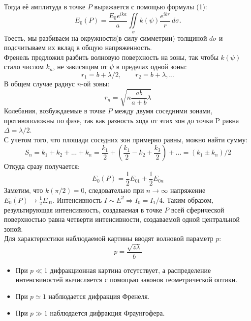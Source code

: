 \documentclass[12pt]{article}
\begin{document}
	  Тогда её амплитуда в точке $P$ выражается с помощью формулы (1):
	 \begin{equation}
	 E_0(P) = \frac{E_0 e^{ika}}{a} \iint\limits_\sigma k(\psi) \frac{e^{ikr}}{r}\,d\sigma.
	 \end{equation} 
	 Тоесть, мы разбиваем на окружности(в силу симметрии) толщиной $d\sigma$ и подсчитываем их вклад в общую напряженность.\\
	 Френель предложил разбить волновую поверхность на зоны, так чтобы $k(\psi)$ стало числом $k_n$, не зависящим от $\psi$ в пределах одной зоны: \begin{equation}
	 r_1 = b + \lambda/2, \mbox{ }\mbox{ }\mbox{ } r_2 = b + \lambda,...
	 \end{equation}
	 В общем случае радиус $n$-ой зоны: \begin{equation}
	 r_n = \sqrt{n \frac{ab}{a+b}\lambda}
	 \end{equation}
	 Колебания, возбуждаемые в точке $P$ между двумя соседними зонами, противоположны по фазе, так как разность хода от этих зон до точки P равна $\Delta = \lambda/2$.\\
	 С учетом того, что площади соседних зон примерно равны, можно найти сумму: \begin{equation}
	 S_n = k_1 + k_2 + \dots + k_n = \frac{k_1}{2} + (\frac{k_1}{2} - k_2 + \frac{k_3}{2}) + \dots = (k_1 \pm k_n)/2
	 \end{equation}
	 Откуда сразу получается: \begin{equation}
	 E_0(P) = \frac{1}{2}E_{01} + \frac{1}{2}E_{0n}
	 	 \end{equation}
	 Заметим, что $k(\pi/2) = 0$, следовательно при $n \rightarrow \infty$ напряжение $E_0(P) \rightarrow \frac{1}{2}E_{01}$. Интенсивность $I \sim E^2 \Rightarrow I_0 = I_1/4$. Таким образом, результирующая интенсивность, создаваемая в точке $P$ всей сферической поверхностью равна четверти интенсивности, создаваемой одной центральной зоной.\\
	 Для характеристики наблюдаемой картины вводят волновой параметр $p$: \[
	 	p = \frac{\sqrt{z\lambda}}{b}
	 \]
	 \begin{itemize}
	 	\item  При $p \ll 1$ дифракционная картина отсутствует, а распределение интенсвиностей вычисляется с помощью законов геометрической оптики.
	 	\item При $p \simeq 1$ наблюдается дифракция Френеля.
	 	\item  При  $p \gg 1$ наблюдается дифракция Фраунгофера.
	 \end{itemize}
 \newpage
\end{document}
